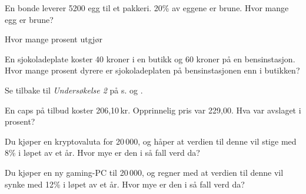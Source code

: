 En bonde leverer 5200 egg til et pakkeri. 20\% av eggene er brune.
Hvor mange egg er brune?

Hvor mange prosent utgjør\os
{}

En sjokoladeplate koster 40 kroner i en butikk
og 60 kroner på en bensinstasjon. Hvor mange prosent dyrere er sjokoladeplaten
på bensinstasjonen enn i butikken?

Se tilbake til \textsl{Undersøkelse 2} på s. \pageref{undersok} og \pageref{sektorund2}. 

 \vs
{}

\newpage
{} \vs
{}

En caps på tilbud koster 206,10\,kr. Opprinnelig pris var 229,00. Hva var avslaget i prosent?

Du kjøper en kryptovaluta for 20\,000, og håper at verdien til denne vil stige med 8\% i løpet av et år. Hvor mye er den i så fall verd da?

Du kjøper en ny gaming-PC til 20\,000, og regner med at verdien til denne vil synke med 12\% i løpet av et år. Hvor mye er den i så fall verd da?

